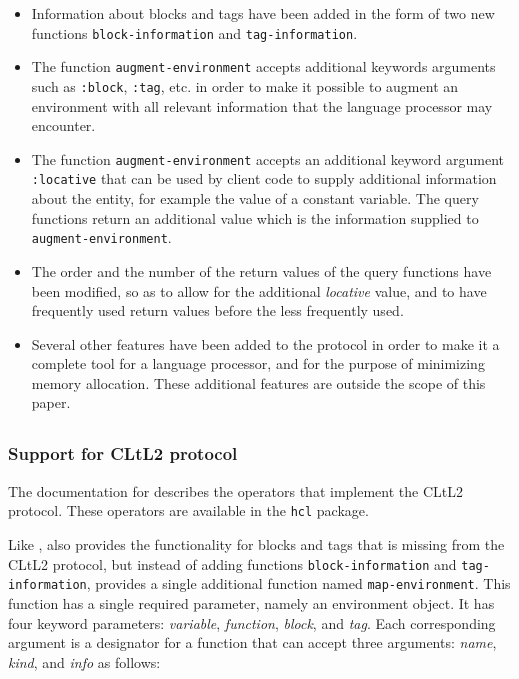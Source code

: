\begin{itemize}
\item Information about blocks and tags have been added in the form of
  two new functions \texttt{block-information} and
  \texttt{tag-information}.
\item The function \texttt{augment-environment} accepts additional
  keywords arguments such as \texttt{:block}, \texttt{:tag}, etc. in
  order to make it possible to augment an environment with all
  relevant information that the language processor may encounter.
\item The function \texttt{augment-environment} accepts an additional
  keyword argument \texttt{:locative} that can be used by client code
  to supply additional information about the entity, for example the
  value of a constant variable. The query functions return an
  additional value which is the information supplied to
  \texttt{augment-environment}.
\item The order and the number of the return values of the query
  functions have been modified, so as to allow for the additional
  \emph{locative} value, and to have frequently used return values
  before the less frequently used.
\item Several other features have been added to the protocol in order
  to make it a complete tool for a language processor, and for the
  purpose of minimizing memory allocation.  These additional features
  are outside the scope of this paper.
\end{itemize}

\subsection{\lispworks{}}
\label{sec-previous-lispworks}

\subsubsection{Support for CLtL2 protocol}

The documentation for \lispworks{} \commonlisp{} describes the
operators that implement the CLtL2 protocol.  These operators are
available in the \texttt{hcl} package.

Like \allegro{}, \lispworks{} also provides the functionality for
blocks and tags that is missing from the CLtL2 protocol, but instead
of adding functions \texttt{block-information} and
\texttt{tag-information}, \lispworks{} provides a single additional
function named \texttt{map-environment}.  This function has a single
required parameter, namely an environment object.  It has four
keyword parameters: \textit{variable}, \textit{function},
\textit{block}, and \textit{tag}.  Each corresponding argument is a
designator for a function that can accept three arguments:
\textit{name}, \textit{kind}, and \textit{info} as follows:

